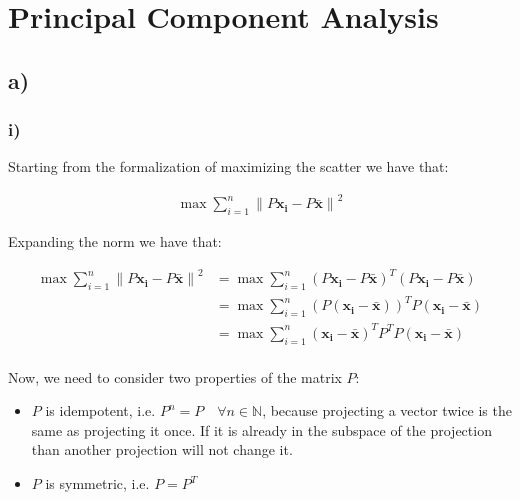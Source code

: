 \documentclass[12pt,a4paper,oneside]{paper}
\begin{document}
\pagestyle{plain}


\def\title {Homework Assignment 3}

 
\cleardoublepage
{}\selectfont
\setcounter{page}{0}
\tableofcontents
\newpage

\small

\section{Principal Component Analysis}

\subsection*{a)}

\subsubsection*{i)}

Starting from the formalization of maximizing the scatter we have that: 

\begin{align*}
        \max \sum_{i=1}^{n} \left\| P \bm{x_i} - P \bm{\bar{x}} \right\|^2
\end{align*}

Expanding the norm we have that:


\begin{align*}
    \max \sum_{i=1}^{n} \left\| P \bm{x_i} - P \bm{\bar{x}} \right\|^2 &= \max \sum_{i=1}^{n} \left( P \bm{x_i} - P \bm{\bar{x}} \right)^T \left( P \bm{x_i} - P \bm{\bar{x}} \right) \\
    &= \max \sum_{i=1}^{n} \left( P \left( \bm{x_i} - \bm{\bar{x}} \right) \right)^T P \left( \bm{x_i} - \bm{\bar{x}} \right) \\
    &= \max \sum_{i=1}^{n} \left( \bm{x_i} - \bm{\bar{x}} \right)^T P^T P \left( \bm{x_i} - \bm{\bar{x}} \right) \\
\end{align*}

Now, we need to consider two properties of the matrix $P$:
\begin{itemize}
    \item $P$ is idempotent, i.e. $P^n = P \quad \forall n \in \mathbb{N} $, because projecting a vector twice is the same as projecting it once. If it is already in the subspace of the projection than another projection will not change it.
    \item $P$ is symmetric, i.e. $P = P^T$
\end{itemize}
\end{document}
